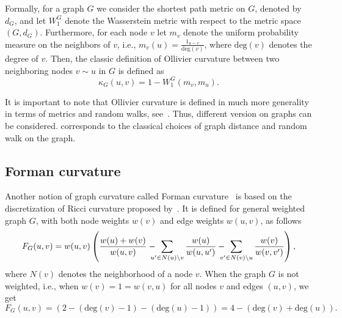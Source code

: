 \documentclass{article} %
\begin{document}
Formally, for a graph $G$ we consider the shortest path metric on $G$, denoted by $d_G$, and let $W_1^G$ denote the Wasserstein metric with respect to the metric space $(G,d_G)$. Furthermore, for each node $v$ let $m_v$ denote the uniform probability measure on the neighbors of $v$, i.e., $m_v(u) = \frac{1_{u \sim v}}{\mathrm{deg}(v)}$, where $\mathrm{deg}(v)$ denotes the degree of $v$. Then, the classic definition of Ollivier curvature between two neighboring nodes $v \sim u$ in $G$ is defined as
\begin{equation}\label{eq:def_classic_ollivier_graphs}
	\kappa_G(u,v) = 1 - W_1^G(m_v, m_u).
\end{equation}

It is important to note that Ollivier curvature is defined in much more generality in terms of metrics and random walks, see~\citep{ollivier2009ricci}. Thus, different version on graphs can be considered.  corresponds to the classical choices of graph distance and random walk on the graph.




\subsection{Forman curvature}

Another notion of graph curvature called Forman curvature~\citep{sreejith2016forman} is based on the discretization of Ricci curvature proposed by~\citet{forman2003bochner}. It is defined for general weighted graph $G$, with both node weights $w(v)$ and edge weights $w(u,v)$, as follows
\begin{equation}\label{eq:forman}
	F_G(u,v) = w(u,v) \left(\frac{w(u) + w(v)}{w(u,v)} - \hspace{-8pt}\sum_{u^\prime \in N(u)\setminus v}  \frac{w(u)}{w(u,u^\prime)} - \hspace{-8pt} \sum_{v^\prime \in N(v) \setminus u} \frac{w(v)}{w(v,v^\prime)}\right),
\end{equation}
where $N(v)$ denotes the neighborhood of a node $v$. 
When the graph $G$ is not weighted, i.e., when $w(v) = 1 = w(v,u)$ for all nodes $v$ and edges $(u,v)$, we get
\begin{equation}\label{eq:forman2}
F_G(u,v) = \left(2 - (\mathrm{deg}(v) - 1) - (\mathrm{deg}(u) - 1)\right) = 4 - (\mathrm{deg}(v) + \mathrm{deg}(u)).
\end{equation}
\end{document}
